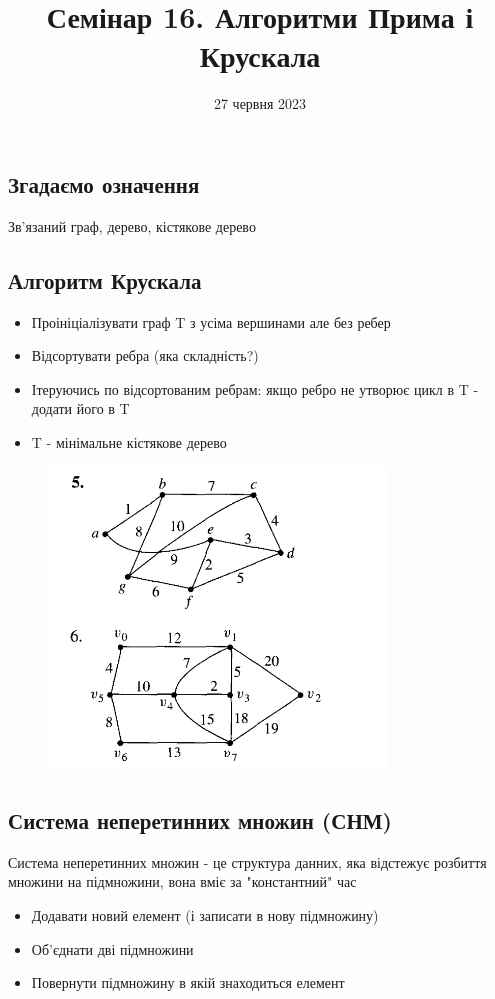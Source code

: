 \documentclass{article}
\begin{document}
\title{Семінар 16. Алгоритми Прима і Крускала}
\date{27 червня 2023}

\maketitle

\subsection*{Згадаємо означення}
Зв'язаний граф, дерево, кістякове дерево

\subsection*{Алгоритм Крускала}
\begin{itemize}
    \item Проініціалізувати граф T з усіма вершинами але без ребер
    \item Відсортувати ребра (яка складність?)
    \item Ітеруючись по відсортованим ребрам:
        \subitem якщо ребро не утворює цикл в T - додати його в T
    \item T - мінімальне кістякове дерево
\end{itemize}

\begin{figure}[h]
\centering
\includegraphics[width=90mm]{1}
\end{figure}

\subsection*{Система неперетинних множин (СНМ)}
Система неперетинних множин - це структура данних, яка відстежує розбиття множини на підмножини, вона вміє за "константний" час
\begin{itemize}
    \item Додавати новий елемент (і записати в нову підмножину)
    \item Об'єднати дві підмножини
    \item Повернути підмножину в якій знаходиться елемент
\end{itemize}
\end{document}

